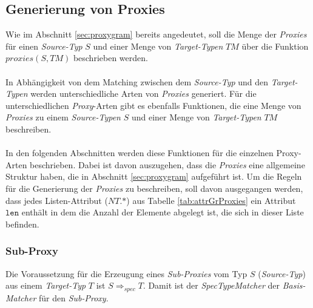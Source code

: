 \subsection{Generierung von Proxies}\label{sec_proxyGen}
Wie im Abschnitt \ref{sec:proxygram} bereits angedeutet, soll die Menge der \emph{Proxies} für einen \emph{Source-Typ} $S$ und einer Menge von \emph{Target-Typen} $\mathit{TM}$ über die Funktion $\mathit{proxies(S,\mathit{TM})}$ beschrieben werden.
\\\\
In Abhängigkeit von dem Matching zwischen dem \emph{Source-Typ} und den \emph{Target-Typen} werden unterschiedliche Arten von \emph{Proxies} generiert. Für die unterschiedlichen \emph{Proxy}-Arten gibt es ebenfalls Funktionen, die eine Menge von \emph{Proxies} zu einem \emph{Source-Typen} $S$ und einer Menge von \emph{Target-Typen} $\mathit{TM}$ beschreiben.
\\\\
In den folgenden Abschnitten werden diese Funktionen für die einzelnen Proxy-Arten beschrieben. Dabei ist davon auszugehen, dass die \emph{Proxies} eine allgemeine Struktur haben, die in Abschnitt \ref{sec:proxygram} aufgeführt ist. Um die Regeln für die Generierung der \emph{Proxies} zu beschreiben, soll davon ausgegangen werden, dass jedes Listen-Attribut ($\mathit{NT.}\text{*}$) aus Tabelle \ref{tab:attrGrProxies} ein Attribut $\texttt{len}$ enthält in dem die Anzahl der Elemente abgelegt ist, die sich in dieser Liste befinden.


\subsubsection{Sub-Proxy}
Die Voraussetzung für die Erzeugung eines \emph{Sub-Proxies} vom Typ $S$ (\emph{Source-Typ}) aus einem \emph{Target-Typ} $\mathit{T}$ ist $S \Rightarrow_{spec} T$. Damit ist der \emph{SpecTypeMatcher} der \emph{Basis-Matcher} für den \emph{Sub-Proxy}.

